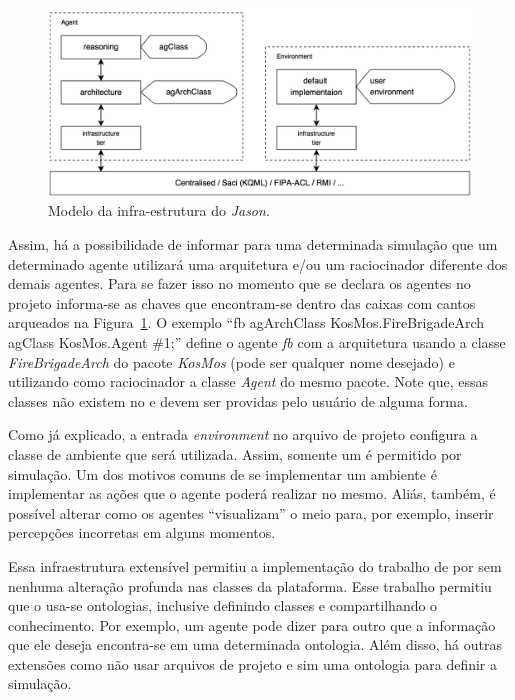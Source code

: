 \begin{figure}
               \begin{center}
               \includegraphics[width=140mm]{figuras/infra.png} 
                \end{center}
                \caption{Modelo da infra-estrutura do \emph{Jason}.}
                \label{fig-jason-infra-1}
\end{figure}

Assim, há a possibilidade de informar para uma determinada simulação que um
determinado agente utilizará uma arquitetura e/ou um raciocinador diferente
dos demais agentes. Para se fazer isso no momento que se declara os agentes
no projeto informa-se as chaves que encontram-se dentro das caixas com
cantos arqueados na Figura~\ref{fig-jason-infra-1}. O exemplo
``fb agArchClass KosMos.FireBrigadeArch agClass KosMos.Agent \#1;'' define
o agente \emph{fb} com a arquitetura usando a classe \emph{FireBrigadeArch}
do pacote \emph{KosMos} (pode ser qualquer nome desejado) e utilizando como
raciocinador a classe \emph{Agent} do mesmo pacote. Note que, essas classes
não existem no \jason e devem ser providas pelo usuário de alguma forma.

Como já explicado, a entrada \emph{environment} no arquivo de projeto
configura a classe de ambiente que será utilizada. Assim, somente um
é permitido por simulação. Um dos motivos comuns de se implementar um
ambiente é implementar as ações que o agente poderá realizar no mesmo. Aliás,
também, é possível alterar como os agentes ``visualizam'' o meio para, por
exemplo, inserir percepções incorretas em alguns momentos.

Essa infraestrutura extensível permitiu a implementação do trabalho de
\citet{moreira2006agent} por \citet{KlaBor09} sem nenhuma alteração profunda
nas classes da plataforma. Esse trabalho permitiu que o \jason usa-se
ontologias, inclusive definindo classes e compartilhando o conhecimento. Por
exemplo, um agente pode dizer para outro que a informação que ele deseja
encontra-se em uma determinada ontologia. Além disso, há outras extensões como
não usar arquivos de projeto e sim uma ontologia para definir a simulação.

